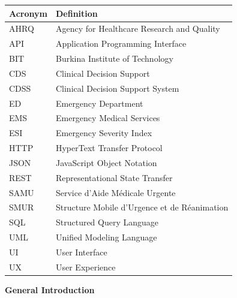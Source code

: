 \documentclass[a4paper,12pt,oneside]{report}
\begin{document}
\begin{longtable}{|p{3.5cm}|p{10.5cm}|}
\hline
\textbf{Acronym} & \textbf{Definition} \\
\hline
AHRQ & Agency for Healthcare Research and Quality \\
\hline
API & Application Programming Interface \\
\hline
BIT & Burkina Institute of Technology \\
\hline
CDS & Clinical Decision Support \\
\hline
CDSS & Clinical Decision Support System \\
\hline
ED & Emergency Department \\
\hline
EMS & Emergency Medical Services \\
\hline
ESI & Emergency Severity Index \\
\hline
HTTP & HyperText Transfer Protocol \\
\hline
JSON & JavaScript Object Notation \\
\hline
REST & Representational State Transfer \\
\hline
SAMU & Service d'Aide M\'edicale Urgente \\
\hline
SMUR & Structure Mobile d'Urgence et de R\'eanimation \\
\hline
SQL & Structured Query Language \\
\hline
UML & Unified Modeling Language \\
\hline
UI & User Interface \\
\hline
UX & User Experience \\
\hline
\end{longtable}
\clearpage

\newpage
\thispagestyle{fancy}
\begingroup
\tableofcontents
\endgroup
\clearpage

\newpage
\thispagestyle{fancy}
\listoffigures
\clearpage

\newpage
\thispagestyle{fancy}
\listoftables
\clearpage

\newpage
\thispagestyle{fancy}
{\LARGE \bfseries \noindent General Introduction}
\vspace{2em}
\justifying
\end{document}
